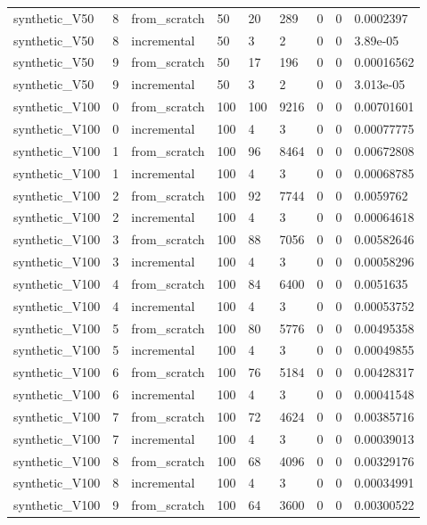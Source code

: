 \begin{table}[t]
\begin{tabular}{lllllllll}
synthetic\_V50 & 8 & from\_scratch & 50 & 20 & 289 & 0 & 0 & 0.0002397 \\
synthetic\_V50 & 8 & incremental & 50 & 3 & 2 & 0 & 0 & 3.89e-05 \\
synthetic\_V50 & 9 & from\_scratch & 50 & 17 & 196 & 0 & 0 & 0.00016562 \\
synthetic\_V50 & 9 & incremental & 50 & 3 & 2 & 0 & 0 & 3.013e-05 \\
synthetic\_V100 & 0 & from\_scratch & 100 & 100 & 9216 & 0 & 0 & 0.00701601 \\
synthetic\_V100 & 0 & incremental & 100 & 4 & 3 & 0 & 0 & 0.00077775 \\
synthetic\_V100 & 1 & from\_scratch & 100 & 96 & 8464 & 0 & 0 & 0.00672808 \\
synthetic\_V100 & 1 & incremental & 100 & 4 & 3 & 0 & 0 & 0.00068785 \\
synthetic\_V100 & 2 & from\_scratch & 100 & 92 & 7744 & 0 & 0 & 0.0059762 \\
synthetic\_V100 & 2 & incremental & 100 & 4 & 3 & 0 & 0 & 0.00064618 \\
synthetic\_V100 & 3 & from\_scratch & 100 & 88 & 7056 & 0 & 0 & 0.00582646 \\
synthetic\_V100 & 3 & incremental & 100 & 4 & 3 & 0 & 0 & 0.00058296 \\
synthetic\_V100 & 4 & from\_scratch & 100 & 84 & 6400 & 0 & 0 & 0.0051635 \\
synthetic\_V100 & 4 & incremental & 100 & 4 & 3 & 0 & 0 & 0.00053752 \\
synthetic\_V100 & 5 & from\_scratch & 100 & 80 & 5776 & 0 & 0 & 0.00495358 \\
synthetic\_V100 & 5 & incremental & 100 & 4 & 3 & 0 & 0 & 0.00049855 \\
synthetic\_V100 & 6 & from\_scratch & 100 & 76 & 5184 & 0 & 0 & 0.00428317 \\
synthetic\_V100 & 6 & incremental & 100 & 4 & 3 & 0 & 0 & 0.00041548 \\
synthetic\_V100 & 7 & from\_scratch & 100 & 72 & 4624 & 0 & 0 & 0.00385716 \\
synthetic\_V100 & 7 & incremental & 100 & 4 & 3 & 0 & 0 & 0.00039013 \\
synthetic\_V100 & 8 & from\_scratch & 100 & 68 & 4096 & 0 & 0 & 0.00329176 \\
synthetic\_V100 & 8 & incremental & 100 & 4 & 3 & 0 & 0 & 0.00034991 \\
synthetic\_V100 & 9 & from\_scratch & 100 & 64 & 3600 & 0 & 0 & 0.00300522 \\

\end{tabular}
\end{table}
